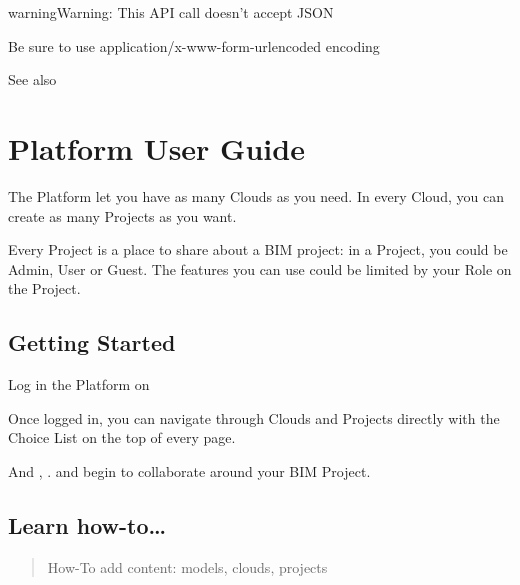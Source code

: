 \documentclass[a4paper,12pt,english]{sphinxmanual}
\begin{document}
\begin{sphinxadmonition}{warning}{Warning:}
This API call doesn’t accept JSON

Be sure to use application/x-www-form-urlencoded encoding
\end{sphinxadmonition}




See also {\hyperref[\detokenize{api/introduction::doc}]{}}




\chapter{Platform User Guide}
\label{\detokenize{platform/index:platform-user-guide}}\label{\detokenize{platform/index::doc}}
The Platform let you have as many Clouds as you need.
In every Cloud, you can create as many Projects as you want.

Every Project is a place to share about a BIM project: in a Project, you could be Admin, User or Guest.
The features you can use could be limited by your Role on the Project.


\section{Getting Started}
\label{\detokenize{platform/index:getting-started}}

Log in the Platform on 

Once logged in, you can navigate through Clouds and Projects directly with the Choice List on the top of every page.

And {\hyperref[\detokenize{platform/add_content::doc}]{}}, {\hyperref[\detokenize{platform/add_content::doc}]{}}. {\hyperref[\detokenize{platform/collaborate::doc}]{}} and begin to collaborate around your BIM Project.


\section{Learn how-to…}
\label{\detokenize{platform/index:learn-how-to}}
\begin{sphinxShadowBox}
\begin{quote}

How-To add content: models, clouds, projects
\end{quote}
\end{sphinxShadowBox}
\end{document}
